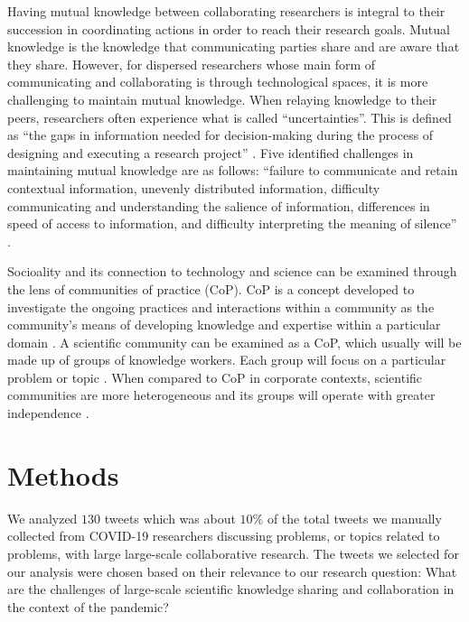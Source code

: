 \documentclass[acmsmall,authordraft]{acmart}
\begin{document}
Having mutual knowledge between collaborating researchers is integral to their succession in coordinating actions in order to reach their research goals. Mutual knowledge is the knowledge that communicating parties share and are aware that they share. However, for dispersed researchers whose main form of communicating and collaborating is through technological spaces, it is more challenging to maintain mutual knowledge. When relaying knowledge to their peers, researchers often experience what is called ``uncertainties''. This is defined as ``the gaps in information needed for decision-making during the process of designing and executing a research project'' \citep{law2017crowdsourcing}. Five identified challenges in maintaining mutual knowledge are as follows: ``failure to communicate and retain contextual information, unevenly distributed information, difficulty communicating and understanding the salience of information, differences in speed of access to information, and difficulty interpreting the meaning of silence'' \citep{cramton2001mutual}.  

Socioality and its connection to technology and science can be examined through the lens of communities of practice (CoP). CoP is a concept developed to investigate the ongoing practices and interactions within a community as the community’s means of developing knowledge and expertise within a particular domain \citep{wenger2002cultivating}. A scientific community can be examined as a CoP, which usually will be made up of groups of knowledge workers. Each group will focus on a particular problem or topic \citep{kienle2005principles}. When compared to CoP in corporate contexts, scientific communities are more heterogeneous and its groups will operate with greater independence \citep{doerry1997participatory}.      


\section{Methods}
\label{Methods}
We analyzed $130$ tweets which was about $10\%$ of the total tweets we manually collected from COVID-19 researchers discussing problems, or topics related to problems, with large large-scale collaborative research. The tweets we selected for our analysis were chosen based on their relevance to our research question: What are the challenges of large-scale scientific knowledge sharing and collaboration in the context of the pandemic? 
\end{document}
